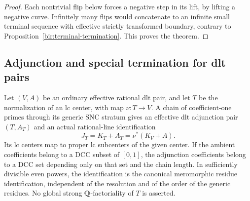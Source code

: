 \begin{proof}
Each nontrivial flip below forces a negative step in its lift, by
lifting a negative curve.  Infinitely many flips would concatenate
to an infinite small terminal sequence with effective strictly
transformed boundary, contrary to
Proposition~\ref{bir:terminal-termination}.  This proves the theorem.
\end{proof}

\subsection{Adjunction and special termination for dlt pairs}
\label{bir:dlt-section}

\begin{lemma}
\label{bir:stratum-adjunction}
Let $(V,A)$ be an ordinary effective rational dlt pair, and let $T$
be the normalization of an lc center, with map $\nu:T\to V$.  A
chain of coefficient-one primes through its generic SNC stratum
gives an effective dlt adjunction pair $(T,A_T)$ and an actual
rational-line identification
\begin{equation}
 J_T=K_T+A_T=\nu^*(K_V+A).
 \label{bir:stratum-line}
\end{equation}
Its lc centers map to proper lc subcenters of the given center.
If the ambient coefficients belong to a DCC subset of $[0,1]$, the
adjunction coefficients belong to a DCC set depending only on that
set and the chain length.  In sufficiently divisible even powers,
the identification is the canonical meromorphic residue
identification, independent of the resolution and of the order of
the generic residues.  No global strong $\mathbb{Q}$-factoriality of $T$ is
asserted.
\end{lemma}

